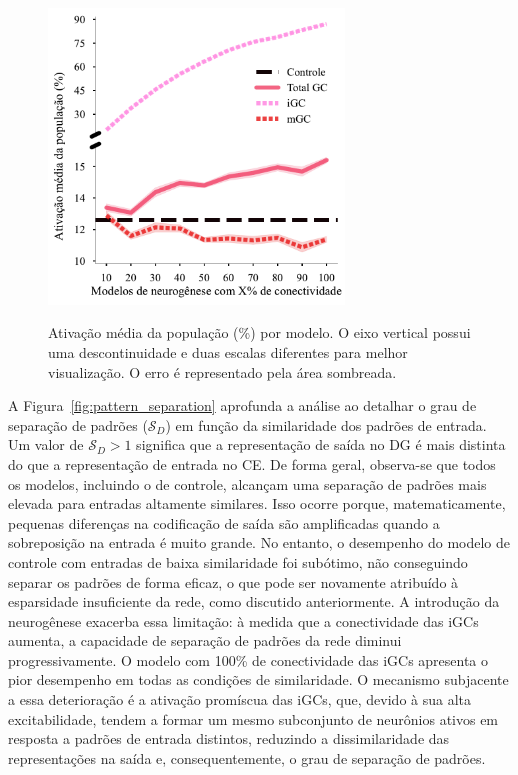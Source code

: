 \begin{figure}[H]
    \centering
    \caption{Ativação média da população (\%) por modelo. O eixo vertical possui uma descontinuidade e duas escalas diferentes para melhor visualização. O erro é representado pela área sombreada.}
    \includegraphics[width=0.7\textwidth]{figuras/plots/avg_activity}
    \label{fig:avg_activity}
\end{figure}


A Figura~\ref{fig:pattern_separation} aprofunda a análise ao detalhar o grau de separação de padrões ($\mathcal{S}_D$) em função
da similaridade dos padrões de entrada. Um valor de $\mathcal{S}_D > 1$ significa que a representação de saída no DG é mais
distinta do que a representação de entrada no CE. De forma geral, observa-se que todos os modelos, incluindo o de controle,
alcançam uma separação de padrões mais elevada para entradas altamente similares. Isso ocorre porque, matematicamente, pequenas
diferenças na codificação de saída são amplificadas quando a sobreposição na entrada é muito grande. No entanto, o desempenho do
modelo de controle com entradas de baixa similaridade foi subótimo, não conseguindo separar os padrões de forma eficaz, o que pode
ser novamente atribuído à esparsidade insuficiente da rede, como discutido anteriormente. A introdução da neurogênese exacerba
essa limitação: à medida que a conectividade das iGCs aumenta, a capacidade de separação de padrões da rede diminui
progressivamente. O modelo com 100\% de conectividade das iGCs apresenta o pior desempenho em todas as condições de similaridade.
O mecanismo subjacente a essa deterioração é a ativação promíscua das iGCs, que, devido à sua alta excitabilidade, tendem a formar
um mesmo subconjunto de neurônios ativos em resposta a padrões de entrada distintos, reduzindo a dissimilaridade das
representações na saída e, consequentemente, o grau de separação de padrões.


